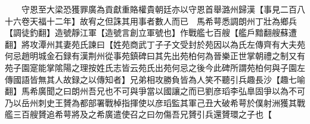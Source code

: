 　　守恩至大梁恐獲罪廣為貢獻重賂權貴朝廷亦以守恩首舉潞州歸漢【事見二百八十六卷天福十二年】故宥之但誅其用事者數人而已　馬希萼悉調朗州丁壯為鄉兵【調徒釣翻】造號靜江軍【造號言創立軍號也】作戰艦七百艘【艦戶黯翻艘蘇遭翻】將攻潭州其妻苑氏諫曰【姓苑商武丁子子文受封於苑因以為氏左傳齊有大夫苑何忌趙明城金石録有漢荆州從事苑鎮碑曰其先出苑柏何為晉樂正世掌朝禮之制又有苑子園寔能掌隂陽之理按姓氏志皆云苑氏出苑何忌之後今此碑所謂苑柏何與子園左傳國語皆無其人故録之以傳知者】兄弟相攻勝負皆為人笑不聽引兵趣長沙【趣七喻翻】馬希廣聞之曰朗州吾兄也不可與爭當以國讓之而已劉彦瑫李弘臯固爭以為不可乃以岳州刺史王贇為都部署戰棹指揮使以彦瑫監其軍己丑大破希萼於僕射洲獲其戰艦三百艘贇追希萼將及之希廣遣使召之曰勿傷吾兄贇引兵還贇環之子也【